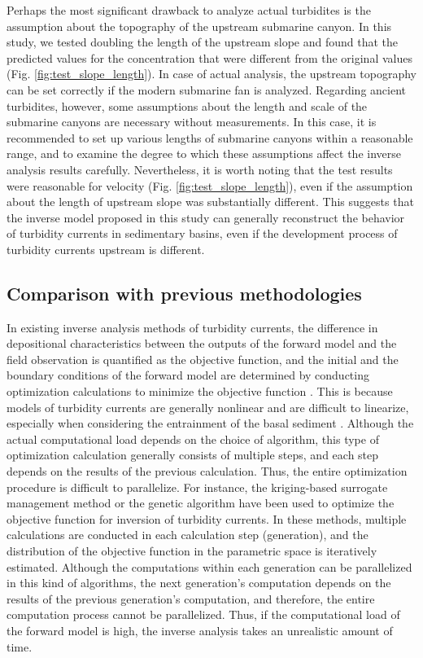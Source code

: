 Perhaps the most significant drawback to analyze actual turbidites is the assumption about the topography of the upstream submarine canyon. In this study, we tested doubling the length of the upstream slope and found that the predicted values for the concentration that were different from the original values (Fig. \ref{fig:test_slope_length}). In case of actual analysis, the upstream topography can be set correctly if the modern submarine fan is analyzed. Regarding ancient turbidites, however, some assumptions about the length and scale of the submarine canyons are necessary without measurements. In this case, it is recommended to set up various lengths of submarine canyons within a reasonable range, and to examine the degree to which these assumptions affect the inverse analysis results carefully. Nevertheless, it is worth noting that the test results were reasonable for velocity (Fig. \ref{fig:test_slope_length}), even if the assumption about the length of upstream slope was substantially different. This suggests that the inverse model proposed in this study can generally reconstruct the behavior of turbidity currents in sedimentary basins, even if the development process of turbidity currents upstream is different.


\subsection{Comparison with previous methodologies}
In existing inverse analysis methods of turbidity currents, the difference in depositional characteristics between the outputs of the forward model and the field observation is quantified as the objective function, and the initial and the boundary conditions of the forward model are determined by conducting optimization calculations to minimize the objective function \cite[e.g.,]{Nakao2017}. This is because models of turbidity currents are generally nonlinear and are difficult to linearize, especially when considering the entrainment of the basal sediment \citep{parker1986self}. Although the actual computational load depends on the choice of algorithm, this type of optimization calculation generally consists of multiple steps, and each step depends on the results of the previous calculation. Thus, the entire optimization procedure is difficult to parallelize. For instance, the kriging-based surrogate management method \citep{lesshafft2011towards} or the genetic algorithm \citep{Nakao2017} have been used to optimize the objective function for inversion of turbidity currents. In these methods, multiple calculations are conducted in each calculation step (generation), and the distribution of the objective function in the parametric space is iteratively estimated. Although the computations within each generation can be parallelized in this kind of algorithms, the next generation's computation depends on the results of the previous generation's computation, and therefore, the entire computation process cannot be parallelized. Thus, if the computational load of the forward model is high, the inverse analysis takes an unrealistic amount of time. 

